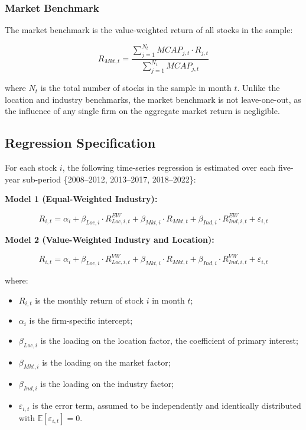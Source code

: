 \documentclass[
  12pt,
]{article}
\providecommand{\tightlist}{%
  \setlength{\itemsep}{0pt}\setlength{\parskip}{0pt}}
\begin{document}
\subsubsection{Market Benchmark}\label{market-benchmark}

The market benchmark is the value-weighted return of all stocks in the
sample:

\[R_{Mkt,t} = \frac{\sum_{j=1}^{N_t} MCAP_{j,t} \cdot R_{j,t}}{\sum_{j=1}^{N_t} MCAP_{j,t}}\]

\noindent where \(N_t\) is the total number of stocks in the sample in
month \(t\). Unlike the location and industry benchmarks, the market
benchmark is not leave-one-out, as the influence of any single firm on
the aggregate market return is negligible.

\subsection{Regression Specification}\label{regression-specification}

For each stock \(i\), the following time-series regression is estimated
over each five-year sub-period \{2008--2012, 2013--2017, 2018--2022\}:

\textbf{Model 1 (Equal-Weighted Industry):}

\[R_{i,t} = \alpha_i + \beta_{Loc,i} \cdot R_{Loc,i,t}^{EW} + \beta_{Mkt,i} \cdot R_{Mkt,t} + \beta_{Ind,i} \cdot R_{Ind,i,t}^{EW} + \varepsilon_{i,t} \tag{1}\]

\textbf{Model 2 (Value-Weighted Industry and Location):}

\[R_{i,t} = \alpha_i + \beta_{Loc,i} \cdot R_{Loc,i,t}^{VW} + \beta_{Mkt,i} \cdot R_{Mkt,t} + \beta_{Ind,i} \cdot R_{Ind,i,t}^{VW} + \varepsilon_{i,t} \tag{2}\]

\noindent where:

\begin{itemize}
\tightlist
\item
  \(R_{i,t}\) is the monthly return of stock \(i\) in month \(t\);
\item
  \(\alpha_i\) is the firm-specific intercept;
\item
  \(\beta_{Loc,i}\) is the loading on the location factor, the
  coefficient of primary interest;
\item
  \(\beta_{Mkt,i}\) is the loading on the market factor;
\item
  \(\beta_{Ind,i}\) is the loading on the industry factor;
\item
  \(\varepsilon_{i,t}\) is the error term, assumed to be independently
  and identically distributed with
  \(\mathbb{E}[\varepsilon_{i,t}] = 0\).
\end{itemize}
\end{document}
